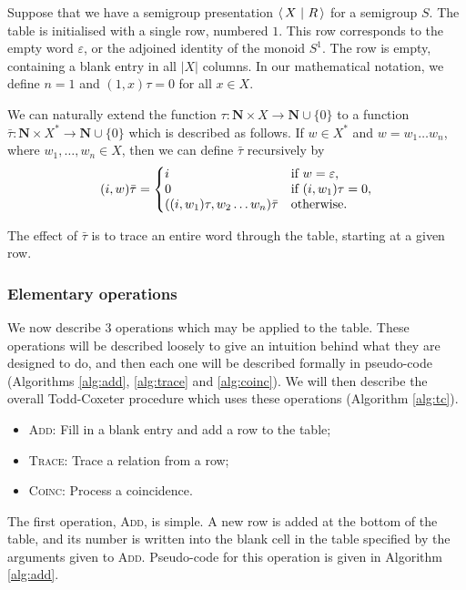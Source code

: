 Suppose that we have a semigroup presentation $\left\langle\,X ~\middle|~ R\,\right\rangle$ for a semigroup
$S$.  The table is initialised with a single row, numbered $1$.  This row
corresponds to the empty word $\varepsilon$, or the adjoined identity of the
monoid $S^1$.  The row is empty, containing a blank entry in all $|X|$ columns.
In our mathematical notation, we define $n=1$ and
$(1,x)\tau = 0$ for all $x \in X$.

We can naturally extend the function
$\tau: \mathbf{N} \times X \to \mathbf{N} \cup \{0\}$
to a function
$\bar{\tau}: \mathbf{N} \times X^* \to \mathbf{N} \cup \{0\}$
which is described as follows.
If $w \in X^*$ and $w=w_1 \ldots w_n$, where $w_1, \ldots, w_n \in X$,
then we can define $\bar\tau$ recursively by
$$
(i, w)\bar\tau = \left\{
\begin{matrix*}[l]
  i & \textnormal{if~} w=\varepsilon,\\
  0 & \textnormal{if~} (i, w_1)\tau=0,\\
  ((i, w_1)\tau, w_2 \ldots w_n)\bar\tau & \textnormal{otherwise}.
\end{matrix*} \right.
$$

The effect of $\bar\tau$ is to trace an entire word through the table, starting
at a given row.

\subsubsection{Elementary operations}

We now describe 3 operations which may be applied to the table.  These
operations will be described loosely to give an intuition behind what they are
designed to do, and then each one will be described formally in pseudo-code
(Algorithms \ref{alg:add}, \ref{alg:trace} and \ref{alg:coinc}).  We will then
describe the overall Todd-Coxeter procedure which uses these operations
(Algorithm \ref{alg:tc}).

\begin{itemize}
\item \textsc{Add}: Fill in a blank entry and add a row to the table;
\item \textsc{Trace}: Trace a relation from a row;
\item \textsc{Coinc}: Process a coincidence.
\end{itemize}

The first operation, \textsc{Add}, is simple.  A new row is added at the bottom
of the table, and its number is written into the blank cell in the table
specified by the arguments given to \textsc{Add}.  Pseudo-code for this
operation is given in Algorithm \ref{alg:add}.

